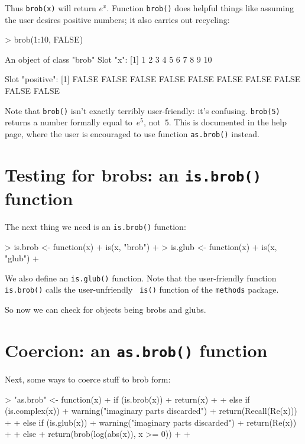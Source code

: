 \documentclass[a4paper]{article}
\begin{document}
Thus {\tt brob(x)} will return $e^x$.  Function {\tt brob()} does
helpful things like assuming the user desires positive numbers; it
also carries out recycling:
\begin{Schunk}
\begin{Sinput}
> brob(1:10, FALSE)
\end{Sinput}
\begin{Soutput}
An object of class "brob"
Slot "x":
 [1]  1  2  3  4  5  6  7  8  9 10

Slot "positive":
 [1] FALSE FALSE FALSE FALSE FALSE FALSE FALSE FALSE FALSE FALSE
\end{Soutput}
\end{Schunk}

Note that {\tt brob()} isn't exactly terribly user-friendly: it's
confusing. {\tt brob(5)} returns a number formally equal to~$e^5$,
not~$5$.   This is documented in the help page, where the user is
encouraged to use function {\tt as.brob()} instead.

\section{Testing for brobs: an {\tt is.brob()} function}

The next thing we need is an {\tt is.brob()} function:

\begin{Schunk}
\begin{Sinput}
> is.brob <- function(x) {
+     is(x, "brob")
+ }
> is.glub <- function(x) {
+     is(x, "glub")
+ }
\end{Sinput}
\end{Schunk}

We also define an {\tt is.glub()} function.  Note that the
user-friendly function {\tt is.brob()} calls the user-unfriendly {\tt
is()} function of the {\tt methods} package.

So now we can check for objects being brobs and glubs.

\section{Coercion: an {\tt as.brob()} function}

Next, some ways to coerce stuff to brob form:

\begin{Schunk}
\begin{Sinput}
> "as.brob" <- function(x) {
+     if (is.brob(x)) {
+         return(x)
+     }
+     else if (is.complex(x)) {
+         warning("imaginary parts discarded")
+         return(Recall(Re(x)))
+     }
+     else if (is.glub(x)) {
+         warning("imaginary parts discarded")
+         return(Re(x))
+     }
+     else {
+         return(brob(log(abs(x)), x >= 0))
+     }
+ }
\end{Sinput}
\end{Schunk}
\end{document}
